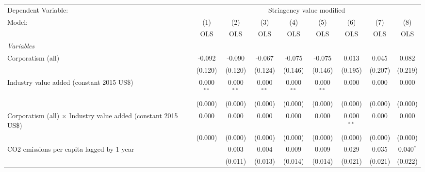 
\begingroup
\centering
\begin{tabular}{lcccccccc}
   \toprule
   Dependent Variable: & \multicolumn{8}{c}{Stringency value modified}\\
   Model:                                                                 & (1)          & (2)          & (3)          & (4)          & (5)          & (6)          & (7)           & (8)\\  
                                                                          &  OLS         & OLS          & OLS          & OLS          & OLS          & OLS          & OLS           & OLS\\  
   \midrule
   \emph{Variables}\\
   Corporatism (all)                                                      & -0.092       & -0.090       & -0.067       & -0.075       & -0.075       & 0.013        & 0.045         & 0.082\\   
                                                                          & (0.120)      & (0.120)      & (0.124)      & (0.146)      & (0.146)      & (0.195)      & (0.207)       & (0.219)\\   
   Industry value added (constant 2015 US\$)                              & 0.000$^{**}$ & 0.000$^{**}$ & 0.000$^{**}$ & 0.000$^{**}$ & 0.000$^{**}$ & 0.000        & 0.000         & 0.000\\   
                                                                          & (0.000)      & (0.000)      & (0.000)      & (0.000)      & (0.000)      & (0.000)      & (0.000)       & (0.000)\\   
   Corporatism (all) $\times$ Industry value added (constant 2015 US\$)   & 0.000        & 0.000        & 0.000        & 0.000        & 0.000        & 0.000$^{**}$ & 0.000         & 0.000\\   
                                                                          & (0.000)      & (0.000)      & (0.000)      & (0.000)      & (0.000)      & (0.000)      & (0.000)       & (0.000)\\   
   CO2 emissions per capita lagged by 1 year                              &              & 0.003        & 0.004        & 0.009        & 0.009        & 0.029        & 0.035         & 0.040$^{*}$\\   
                                                                          &              & (0.011)      & (0.013)      & (0.014)      & (0.014)      & (0.021)      & (0.021)       & (0.022)\\   

\end{tabular}
